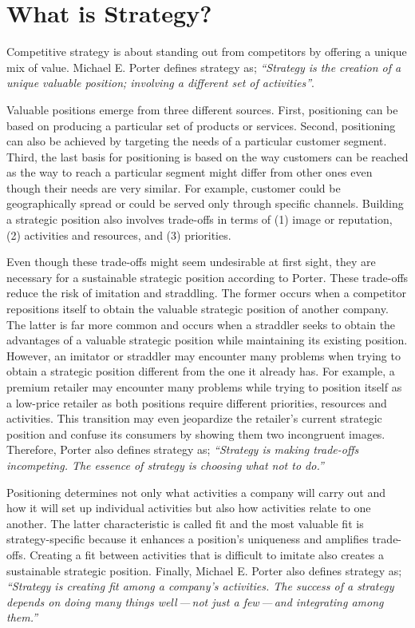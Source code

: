 \chapter{What is Strategy?}\label{ch:ekg-mm-what-is-strategy}

Competitive strategy is about standing out from competitors by offering a unique mix of value.
Michael E. Porter defines strategy as;
\textit{“Strategy is the creation of a unique valuable position; involving a different set of activities”}\autocite{whatisstrategy}.

Valuable positions emerge from three different sources.
First, positioning can be based on producing a particular set of products or services.
Second, positioning can also be achieved by targeting the needs of a particular customer segment.
Third, the last basis for positioning is based on the way customers can be reached as the way to reach a
particular segment might differ from other ones even though their needs are very similar.
For example, customer could be geographically spread or could be served only through specific channels.
Building a strategic position also involves trade-offs in terms of
(1) image or reputation,
(2) activities and resources, and
(3) priorities.

Even though these trade-offs might seem undesirable at first sight,
they are necessary for a sustainable strategic position according to Porter.
These trade-offs reduce the risk of imitation and straddling.
The former occurs when a competitor repositions itself to obtain the valuable strategic position of another company.
The latter is far more common and occurs when a straddler seeks to obtain the advantages of
a valuable strategic position while maintaining its existing position.
However, an imitator or straddler may encounter many problems when trying to obtain a strategic position
different from the one it already has.
For example, a premium retailer may encounter many problems while trying to position itself as a low-price retailer
as both positions require different priorities, resources and activities.
This transition may even jeopardize the retailer's current strategic position and confuse its consumers
by showing them two incongruent images.
Therefore, Porter also defines strategy as;
\textit{“Strategy is making trade-offs incompeting. The essence of strategy is choosing what not to do.”}

Positioning determines not only what activities a company will carry out and how it will set up individual
activities but also how activities relate to one another.
The latter characteristic is called fit and the most valuable fit is strategy-specific because it enhances a
position’s uniqueness and amplifies trade-offs.
Creating a fit between activities that is difficult to imitate also creates a sustainable strategic position.
Finally, Michael E. Porter also defines strategy as;
\textit{“Strategy is creating fit among a company’s activities.
The success of a strategy depends on doing many things well\,---\,not just a few\,---\,and
integrating among them.”}



